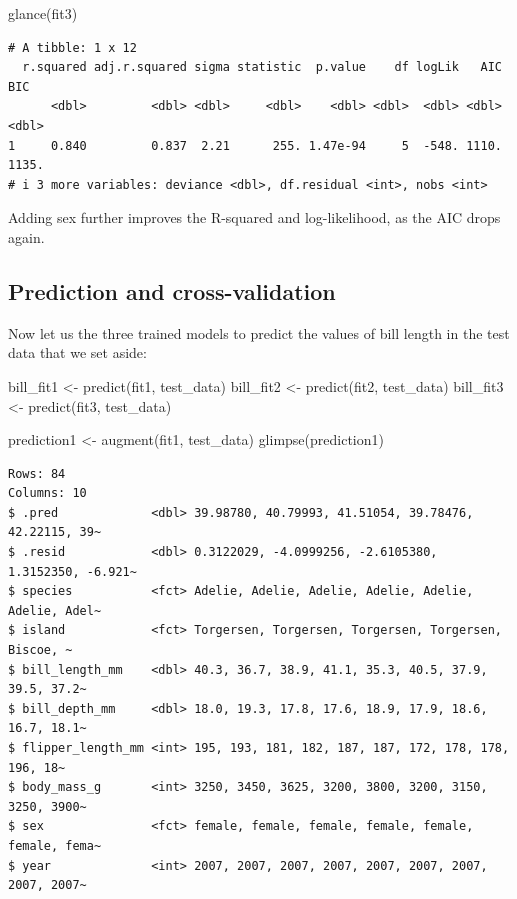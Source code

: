 \documentclass[
  letterpaper,
  DIV=11,
  numbers=noendperiod]{scrreprt}
\newenvironment{Shaded}{\begin{snugshade}}{\end{snugshade}}
\newcommand{\FunctionTok}[1]{\textcolor[rgb]{0.28,0.35,0.67}{#1}}
\newcommand{\NormalTok}[1]{\textcolor[rgb]{0.00,0.23,0.31}{#1}}
\newcommand{\OtherTok}[1]{\textcolor[rgb]{0.00,0.23,0.31}{#1}}
\begin{document}
\begin{Shaded}
\begin{Highlighting}[]
\FunctionTok{glance}\NormalTok{(fit3) }
\end{Highlighting}
\end{Shaded}

\begin{verbatim}
# A tibble: 1 x 12
  r.squared adj.r.squared sigma statistic  p.value    df logLik   AIC   BIC
      <dbl>         <dbl> <dbl>     <dbl>    <dbl> <dbl>  <dbl> <dbl> <dbl>
1     0.840         0.837  2.21      255. 1.47e-94     5  -548. 1110. 1135.
# i 3 more variables: deviance <dbl>, df.residual <int>, nobs <int>
\end{verbatim}

Adding sex further improves the R-squared and log-likelihood, as the AIC
drops again.

\hypertarget{prediction-and-cross-validation}{%
\subsection{Prediction and
cross-validation}\label{prediction-and-cross-validation}}

Now let us the three trained models to predict the values of bill length
in the test data that we set aside:

\begin{Shaded}
\begin{Highlighting}[]
\NormalTok{bill\_fit1 }\OtherTok{\textless{}{-}} \FunctionTok{predict}\NormalTok{(fit1, test\_data)}
\NormalTok{bill\_fit2 }\OtherTok{\textless{}{-}} \FunctionTok{predict}\NormalTok{(fit2, test\_data)}
\NormalTok{bill\_fit3 }\OtherTok{\textless{}{-}} \FunctionTok{predict}\NormalTok{(fit3, test\_data)}

\NormalTok{prediction1 }\OtherTok{\textless{}{-}} \FunctionTok{augment}\NormalTok{(fit1, test\_data)}
\FunctionTok{glimpse}\NormalTok{(prediction1)}
\end{Highlighting}
\end{Shaded}

\begin{verbatim}
Rows: 84
Columns: 10
$ .pred             <dbl> 39.98780, 40.79993, 41.51054, 39.78476, 42.22115, 39~
$ .resid            <dbl> 0.3122029, -4.0999256, -2.6105380, 1.3152350, -6.921~
$ species           <fct> Adelie, Adelie, Adelie, Adelie, Adelie, Adelie, Adel~
$ island            <fct> Torgersen, Torgersen, Torgersen, Torgersen, Biscoe, ~
$ bill_length_mm    <dbl> 40.3, 36.7, 38.9, 41.1, 35.3, 40.5, 37.9, 39.5, 37.2~
$ bill_depth_mm     <dbl> 18.0, 19.3, 17.8, 17.6, 18.9, 17.9, 18.6, 16.7, 18.1~
$ flipper_length_mm <int> 195, 193, 181, 182, 187, 187, 172, 178, 178, 196, 18~
$ body_mass_g       <int> 3250, 3450, 3625, 3200, 3800, 3200, 3150, 3250, 3900~
$ sex               <fct> female, female, female, female, female, female, fema~
$ year              <int> 2007, 2007, 2007, 2007, 2007, 2007, 2007, 2007, 2007~
\end{verbatim}
\end{document}
